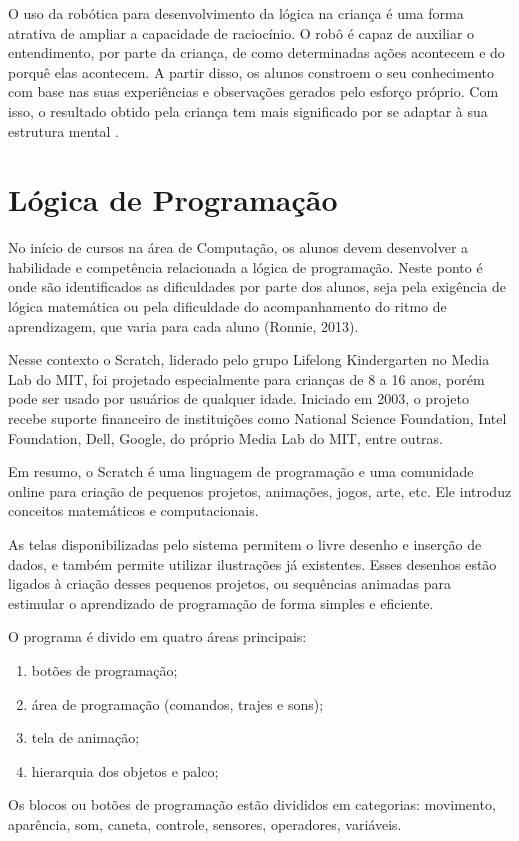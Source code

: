 O uso da robótica para desenvolvimento da lógica na criança é uma forma atrativa de ampliar a capacidade de raciocínio. O robô é capaz de auxiliar o entendimento, por parte da criança, de como determinadas ações acontecem e do porquê elas acontecem. A partir disso, os alunos constroem o seu conhecimento com base nas suas experiências e observações gerados pelo esforço próprio. Com isso, o resultado obtido pela criança tem mais significado por se adaptar à sua estrutura mental \cite{zilli:2004}.

\section{Lógica de Programação}
No início de cursos na área de Computação, os alunos devem desenvolver a habilidade e competência relacionada a lógica de programação. Neste ponto é onde são identificados as dificuldades por parte dos alunos, seja pela exigência de lógica matemática ou pela dificuldade do acompanhamento do ritmo de aprendizagem, que varia para cada aluno (Ronnie, 2013).

Nesse contexto o Scratch, liderado pelo grupo Lifelong Kindergarten no Media Lab do MIT, foi projetado especialmente para crianças de 8 a 16 anos, porém pode ser usado por usuários de qualquer idade. Iniciado em 2003, o projeto recebe suporte financeiro de instituições como National Science Foundation, Intel Foundation, Dell, Google, do próprio Media Lab do MIT, entre outras.

Em resumo, o Scratch é uma linguagem de programação e uma comunidade online para criação de pequenos projetos, animações, jogos, arte, etc. Ele introduz conceitos matemáticos e computacionais.

As telas disponibilizadas pelo sistema permitem o livre desenho e inserção de dados, e também permite utilizar ilustrações já existentes. Esses desenhos estão ligados à criação desses pequenos projetos, ou sequências animadas para estimular o aprendizado de programação de forma simples e eficiente.

O programa é divido em quatro áreas principais:
\begin{enumerate}
	\item botões de programação;
	\item área de programação (comandos, trajes e sons);
	\item tela de animação;
	\item hierarquia dos objetos e palco;
\end{enumerate}

Os blocos ou botões de programação estão divididos em categorias: movimento, aparência, som, caneta, controle, sensores, operadores, variáveis.

